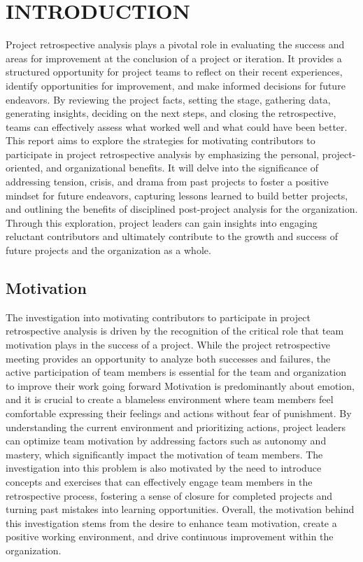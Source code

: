 \documentclass{article}
\begin{document}
\section{INTRODUCTION}
Project retrospective analysis plays a pivotal role in evaluating the success and areas for improvement at the conclusion of a project or iteration. It provides a structured opportunity for project teams to reflect on their recent experiences, identify opportunities for improvement, and make informed decisions for future endeavors. By reviewing the project facts, setting the stage, gathering data, generating insights, deciding on the next steps, and closing the retrospective, teams can effectively assess what worked well and what could have been better. This report aims to explore the strategies for motivating contributors to participate in project retrospective analysis by emphasizing the personal, project-oriented, and organizational benefits. It will delve into the significance of addressing tension, crisis, and drama from past projects to foster a positive mindset for future endeavors, capturing lessons learned to build better projects, and outlining the benefits of disciplined post-project analysis for the organization. Through this exploration, project leaders can gain insights into engaging reluctant contributors and ultimately contribute to the growth and success of future projects and the organization as a whole.

\subsection{Motivation}
The investigation into motivating contributors to participate in project retrospective analysis is driven by the recognition of the critical role that team motivation plays in the success of a project. While the project retrospective meeting provides an opportunity to analyze both successes and failures, the active participation of team members is essential for the team and organization to improve their work going forward Motivation is predominantly about emotion, and it is crucial to create a blameless environment where team members feel comfortable expressing their feelings and actions without fear of punishment. By understanding the current environment and prioritizing actions, project leaders can optimize team motivation by addressing factors such as autonomy and mastery, which significantly impact the motivation of team members. The investigation into this problem is also motivated by the need to introduce concepts and exercises that can effectively engage team members in the retrospective process, fostering a sense of closure for completed projects and turning past mistakes into learning opportunities. Overall, the motivation behind this investigation stems from the desire to enhance team motivation, create a positive working environment, and drive continuous improvement within the organization.
\end{document}

